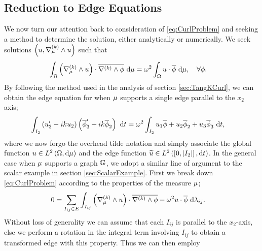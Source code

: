 \subsection{Reduction to Edge Equations}
We now turn our attention back to consideration of \eqref{eq:CurlProblem}  and seeking a method to determine the solution, either analytically or numerically.
We seek solutions $\left( u,\nabla_{\mu}^{(k)}\wedge u \right)$ such that
\begin{align*}
	\int_{\Omega}\left( \nabla_{\mu}^{(k)}\wedge u \right)\cdot\overline{\nabla^{(k)}\wedge\phi} \ \mathrm{d}\mu &= \omega^2\int_{\Omega}u\cdot\overline{\phi} \ \mathrm{d}\mu, \quad \forall\phi .
\end{align*}
By following the method used in the analysis of section \ref{sec:TangKCurl}, we can obtain the edge equation for when $\mu$ supports a single edge parallel to the $x_2$ axis;
\begin{align} \label{eq:OneEdge-EdgeEqn}
	\int_{I_2}\left( u_3^{\prime}-iku_2 \right)\left( \overline{\phi}_3^{\prime}+ik\overline{\phi}_2 \right) \ \mathrm{d}t &= \omega^2\int_{I_2}u_1\overline{\phi} + u_2\overline{\phi}_2 + u_3\overline{\phi}_3 \ \mathrm{d}t,
\end{align}
where we now forgo the overhead tilde notation and simply associate the global function $u\in L^{2}\left( \Omega,\mathrm{d}\mu \right)$ and the edge function $\widetilde{u}\in L^{2}\left( \left[ 0,\lvert I_2 \rvert \right],\mathrm{d}t \right)$.
In the general case when $\mu$ supports a graph $\mathbb{G}$, we adopt a similar line of argument to the scalar example in section \ref{sec:ScalarExample}.
First we break down \eqref{eq:CurlProblem} according to the properties of the measure $\mu$;
\begin{align*}
	0 &= \sum_{I_{ij}\in E} \int_{I_{ij}}\left( \nabla_{\mu}^{(k)}\wedge u \right)\cdot\overline{\nabla^{(k)}\wedge\phi}-\omega^2 u\cdot\overline{\phi} \ \mathrm{d}\lambda_{ij}.
\end{align*}
Without loss of generality we can assume that each $I_{ij}$ is parallel to the $x_2$-axis, else we perform a rotation in the integral term involving $I_{ij}$ to obtain a transformed edge with this property.
Thus we can then employ 

